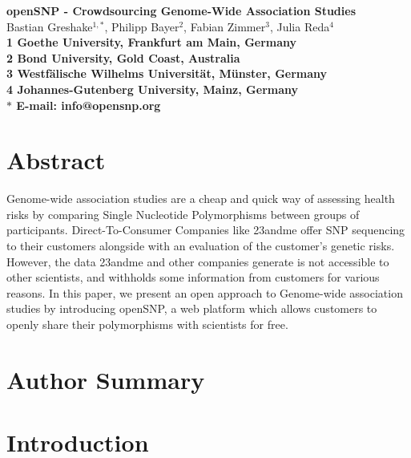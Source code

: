 \documentclass[10pt]{article}
\date{}
\begin{document}
\begin{flushleft}
{\Large
\textbf{openSNP - Crowdsourcing Genome-Wide Association Studies}
}
\\
Bastian Greshake$^{1,\ast}$, 
Philipp Bayer$^{2}$, 
Fabian Zimmer$^{3}$,
Julia Reda$^{4}$
\\
\bf{1} Goethe University, Frankfurt am Main, Germany
\\
\bf{2} Bond University, Gold Coast, Australia
\\
\bf{3} Westf\"alische Wilhelms Universit\"at, M\"unster, Germany
\\
\bf{4} Johannes-Gutenberg University, Mainz, Germany
\\
$\ast$ E-mail: info@opensnp.org
\end{flushleft}

\section*{Abstract}
Genome-wide association studies are a cheap and quick way of assessing health risks by comparing Single Nucleotide Polymorphisms between groups of participants. Direct-To-Consumer Companies like 23andme offer SNP sequencing to their customers alongside with an evaluation of the customer's genetic risks. However, the data 23andme and other companies generate is not accessible to other scientists, and withholds some information from customers for various reasons. In this paper, we present an open approach to Genome-wide association studies by introducing openSNP, a web platform which allows customers to openly share their polymorphisms with scientists for free.  %


\section*{Author Summary}

\section*{Introduction}
\end{document}
